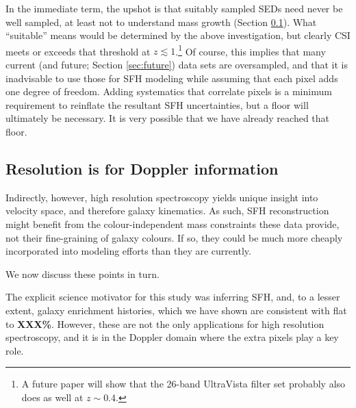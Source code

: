\documentclass[a4paper,fleqn,usenatbib]{mnras}
\newcommand{\bfr}{\bf\color{red}}
\begin{document}


In the immediate term, the upshot is that suitably sampled SEDs need never be well sampled, at least
not to understand mass growth (Section \ref{sec:redshifts}). What ``suitable'' means would be determined 
by the above investigation, but clearly CSI meets or exceeds that threshold at $z\lesssim1$.\footnote{A future 
paper will show that the 26-band UltraVista filter set \citep{Muzzin13} probably also does as well at 
$z\sim0.4$.} Of course, this implies that many current (and future; Section \ref{sec:future}) data sets 
are oversampled, and that it is inadvisable to use those for SFH modeling while assuming that each 
pixel adds one degree of freedom. Adding systematics that correlate pixels is a minimum requirement 
to reinflate the resultant SFH uncertainties, but a floor will ultimately be necessary. It is very possible 
that we have already reached that floor.
\fi


\subsection{Resolution is for Doppler information}
\label{sec:redshifts}

Indirectly, however, high resolution spectroscopy yields unique insight into velocity space, and therefore
galaxy kinematics. As such, SFH reconstruction might benefit from the colour-independent 
mass constraints these data provide, not their fine-graining of galaxy colours. If so, they could be much
more cheaply incorporated into modeling efforts than they are currently.

We now discuss these points in turn.

The explicit science motivator for this study was inferring SFH, and, to a lesser extent, galaxy 
enrichment histories, which we have shown are consistent with flat to {\bfr XXX\%}. However, 
these are not the only applications for high resolution spectroscopy, and it is in the Doppler
domain where the extra pixels play a key role.
\end{document}
